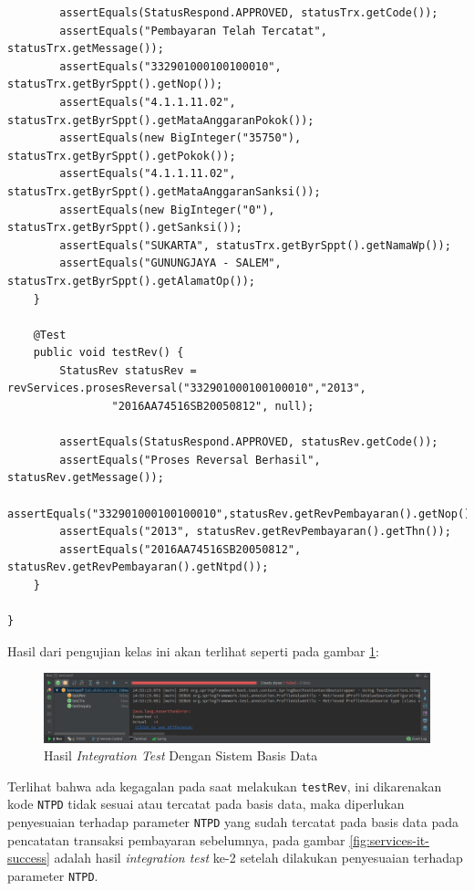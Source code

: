 \documentclass[pdftex,12pt, oneside]{article}
\begin{document}
\begin{enumerate}[A.]
\begin{enumerate}[1.]
\begin{lstlisting}
        assertEquals(StatusRespond.APPROVED, statusTrx.getCode());
        assertEquals("Pembayaran Telah Tercatat", statusTrx.getMessage());
        assertEquals("332901000100100010", statusTrx.getByrSppt().getNop());
        assertEquals("4.1.1.11.02", statusTrx.getByrSppt().getMataAnggaranPokok());
        assertEquals(new BigInteger("35750"), statusTrx.getByrSppt().getPokok());
        assertEquals("4.1.1.11.02", statusTrx.getByrSppt().getMataAnggaranSanksi());
        assertEquals(new BigInteger("0"), statusTrx.getByrSppt().getSanksi());
        assertEquals("SUKARTA", statusTrx.getByrSppt().getNamaWp());
        assertEquals("GUNUNGJAYA - SALEM", statusTrx.getByrSppt().getAlamatOp());
    }

    @Test
    public void testRev() {
        StatusRev statusRev = revServices.prosesReversal("332901000100100010","2013",
                "2016AA74516SB20050812", null);

        assertEquals(StatusRespond.APPROVED, statusRev.getCode());
        assertEquals("Proses Reversal Berhasil", statusRev.getMessage());
        assertEquals("332901000100100010",statusRev.getRevPembayaran().getNop());
        assertEquals("2013", statusRev.getRevPembayaran().getThn());
        assertEquals("2016AA74516SB20050812", statusRev.getRevPembayaran().getNtpd());
    }

}
    \end{lstlisting}
    
    Hasil dari pengujian kelas ini akan terlihat seperti pada gambar \ref{fig:services-it-fail}:
    
    \begin{figure}[H]
      \centering
      \includegraphics[width=1\textwidth]{./resources/07-services-it}
      \caption{Hasil \textit{Integration Test} Dengan Sistem Basis Data}
      \label{fig:services-it-fail}
    \end{figure}
    
    Terlihat bahwa ada kegagalan pada saat melakukan \texttt{testRev}, ini dikarenakan kode \texttt{NTPD} tidak sesuai atau tercatat pada basis data, maka diperlukan penyesuaian terhadap parameter \texttt{NTPD} yang sudah tercatat pada basis data pada pencatatan transaksi pembayaran sebelumnya, pada gambar \ref{fig:services-it-success} adalah hasil \textit{integration test} ke-2 setelah dilakukan penyesuaian terhadap parameter \texttt{NTPD}.
    

\end{enumerate}
\end{enumerate}
\end{document}
